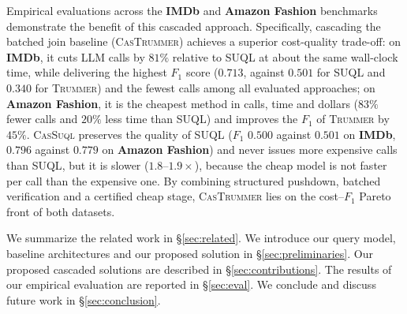 Empirical evaluations across the \textbf{IMDb} and \textbf{Amazon Fashion} benchmarks demonstrate the benefit of this cascaded approach. Specifically, cascading the batched join baseline (\textsc{CasTrummer}) achieves a superior cost-quality trade-off: on \textbf{IMDb}, it cuts LLM calls by $81\%$ relative to \textsc{SUQL} at about the same wall-clock time, while delivering the highest $F_1$ score ($0.713$, against $0.501$ for \textsc{SUQL} and $0.340$ for \textsc{Trummer}) and the fewest calls among all evaluated approaches; on \textbf{Amazon Fashion}, it is the cheapest method in calls, time and dollars ($83\%$ fewer calls and $20\%$ less time than \textsc{SUQL}) and improves the $F_1$ of \textsc{Trummer} by $45\%$. \textsc{CasSuql} preserves the quality of \textsc{SUQL} ($F_1$ $0.500$ against $0.501$ on \textbf{IMDb}, $0.796$ against $0.779$ on \textbf{Amazon Fashion}) and never issues more expensive calls than \textsc{SUQL}, but it is slower ($1.8$--$1.9\times$), because the cheap model is not faster per call than the expensive one. By combining structured pushdown, batched verification and a certified cheap stage, \textsc{CasTrummer} lies on the cost--$F_1$ Pareto front of both datasets.

We summarize the related work in \S\ref{sec:related}. We introduce our query model, baseline architectures and our proposed solution in \S\ref{sec:preliminaries}. Our proposed cascaded solutions are described in \S\ref{sec:contributions}. The results of our empirical evaluation are reported in \S\ref{sec:eval}. We conclude and discuss future work in \S\ref{sec:conclusion}.
